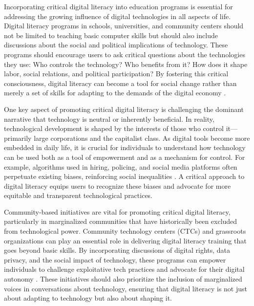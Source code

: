 \begin{refsection}
Incorporating critical digital literacy into education programs is essential for addressing the growing influence of digital technologies in all aspects of life. Digital literacy programs in schools, universities, and community centers should not be limited to teaching basic computer skills but should also include discussions about the social and political implications of technology. These programs should encourage users to ask critical questions about the technologies they use: Who controls the technology? Who benefits from it? How does it shape labor, social relations, and political participation? By fostering this critical consciousness, digital literacy can become a tool for social change rather than merely a set of skills for adapting to the demands of the digital economy \cite[pp.~45-48]{eubanksautomating}.

One key aspect of promoting critical digital literacy is challenging the dominant narrative that technology is neutral or inherently beneficial. In reality, technological development is shaped by the interests of those who control it—primarily large corporations and the capitalist class. As digital tools become more embedded in daily life, it is crucial for individuals to understand how technology can be used both as a tool of empowerment and as a mechanism for control. For example, algorithms used in hiring, policing, and social media platforms often perpetuate existing biases, reinforcing social inequalities \cite[pp.~67-70]{noblealgorithms}. A critical approach to digital literacy equips users to recognize these biases and advocate for more equitable and transparent technological practices.

Community-based initiatives are vital for promoting critical digital literacy, particularly in marginalized communities that have historically been excluded from technological power. Community technology centers (CTCs) and grassroots organizations can play an essential role in delivering digital literacy training that goes beyond basic skills. By incorporating discussions of digital rights, data privacy, and the social impact of technology, these programs can empower individuals to challenge exploitative tech practices and advocate for their digital autonomy \cite[pp.~101-104]{schillerdigitalcapitalism}. These initiatives should also prioritize the inclusion of marginalized voices in conversations about technology, ensuring that digital literacy is not just about adapting to technology but also about shaping it.


\end{refsection}
